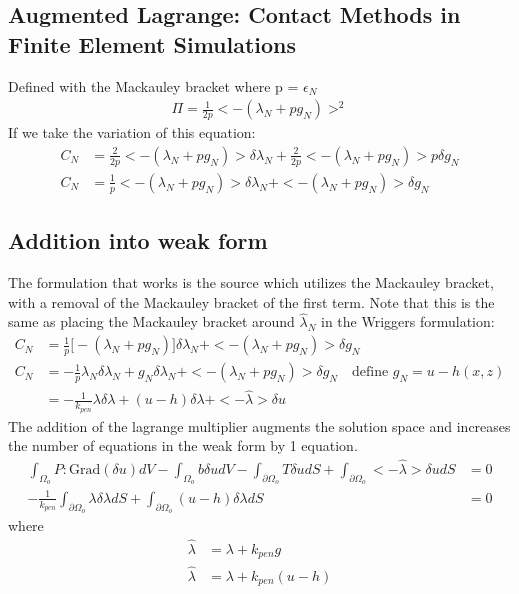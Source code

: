 \documentclass[12pt,3p]{article}
\begin{document}
\subsection{Augmented Lagrange: Contact Methods in Finite Element Simulations}
Defined with the Mackauley bracket where p = $\epsilon_N$
\begin{align*}
\Pi = \frac{1}{2p} < - (\lambda_N + p g_N) >^2
\end{align*}
If we take the variation of this equation:
\begin{align*}
C_N &= \frac{2}{2p} <- (\lambda_N + p g_N)> \delta \lambda_N + \frac{2}{2p} <-(\lambda_N + p g_N) > p \delta g_N \\
C_N &= \frac{1}{p} <- (\lambda_N + p g_N)> \delta \lambda_N + <-(\lambda_N + p g_N) > \delta g_N
\end{align*}

\subsection{Addition into weak form}
The formulation that works is the source which utilizes the Mackauley bracket, with a removal of the Mackauley bracket of the first term. Note that this is the same as placing the Mackauley bracket around $\hat{\lambda}_N$ in the Wriggers formulation: 
\begin{align*}
C_N &= \frac{1}{p} \big[- (\lambda_N + p g_N) \big] \delta \lambda_N + <-(\lambda_N + p g_N) > \delta g_N \\
C_N &= - \frac{1}{p} \lambda_N \delta \lambda_N + g_N \delta \lambda_N + <-(\lambda_N + p g_N) > \delta g_N \quad \text{define } g_N = u - h(x, z) \\
	&= - \frac{1}{k_{pen}} \lambda \delta \lambda + ( u - h ) \delta \lambda + < - \hat{\lambda} > \delta u
\end{align*}
The addition of the lagrange multiplier augments the solution space and increases the number of equations in the weak form by 1 equation. 
\begin{align*}
 \int_{\Omega_o} P : \text{Grad}(\delta u ) dV - \int_{\Omega_o} b \delta u dV - \int_{\partial \Omega_o} T \delta u dS + \int_{\partial \Omega_o} < - \hat{\lambda} > \delta u dS &= 0 \\
- \frac{1}{k_{pen}} \int_{\partial \Omega_o} \lambda \delta \lambda dS +  \int_{\partial \Omega_o} ( u - h ) \delta \lambda dS &= 0
\end{align*}
where 
\begin{align*}
\hat{\lambda} &= \lambda + k_{pen} g \\
\hat{\lambda} &= \lambda + k_{pen} (u - h)
\end{align*}
\end{document}
